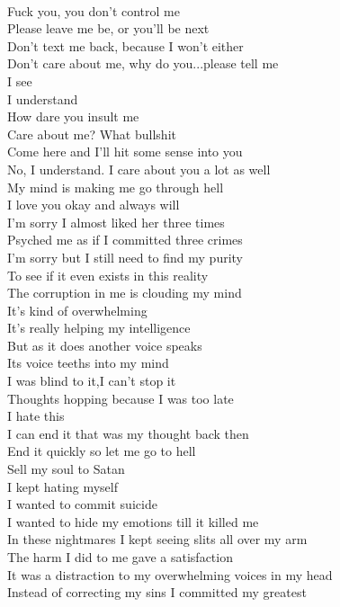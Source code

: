 \documentclass[12pt, b5paper, oneside]{book}
\begin{document}
\\Fuck you, you don't control me
\\Please leave me be, or you'll be next
\\Don't text me back, because I won't either
\\Don't care about me, why do you...please tell me
\\I see
\\I understand
\\How dare you insult me
\\Care about me? What bullshit
\\Come here and I'll hit some sense into you
\\No, I understand. I care about you a lot as well
\\My mind is making me go through hell
\\I love you okay and always will
\\I'm sorry I almost liked her three times
\\Psyched me as if I committed three crimes
\\I'm sorry but I still need to find my purity
\\To see if it even exists in this reality
\\The corruption in me is clouding my mind
\\It's kind of overwhelming
\\It's really helping my intelligence
\\But as it does another voice speaks
\\Its voice teeths into my mind
\\I was blind to it,I can't stop it
\\Thoughts hopping because I was too late
\\I hate this
\\I can end it that was my thought back then
\\End it quickly so let me go to hell
\\Sell my soul to Satan
\\I kept hating myself
\\I wanted to commit suicide
\\I wanted to hide my emotions till it killed me
\\In these nightmares I kept seeing slits all over my arm
\\The harm I did to me gave a satisfaction
\\It was a distraction to my overwhelming voices in my head
\\Instead of correcting my sins I committed my greatest
\end{document}
